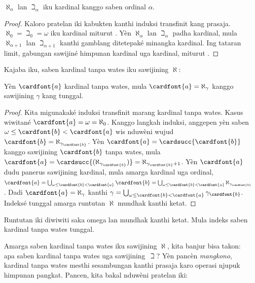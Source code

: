 \documentclass[../../../include/open-logic-section]{subfiles}
\begin{document}
\begin{prop}
$\aleph_\alpha$ lan $\beth_\alpha$ iku kardinal kanggo saben
ordinal $\alpha$.
\end{prop}

\begin{proof}
Kaloro pratelan iki kabukten kanthi induksi transfinit kang prasaja.
$\aleph_0 = \beth_0 = \omega$ iku kardinal miturut
. Yèn $\aleph_\alpha$ lan
$\beth_\alpha$ padha kardinal, mula $\aleph_{\alpha+1}$ lan
$\beth_{\alpha+1}$ kanthi gamblang ditetepaké minangka kardinal.
Ing tataran limit, gabungan sawijiné himpunan kardinal uga kardinal,
miturut .
\end{proof}
\noindent
Kajaba iku, saben kardinal tanpa wates iku sawijining $\aleph$:

\begin{prop}
Yèn $\cardfont{a}$ kardinal tanpa wates, mula $\cardfont{a} =
\aleph_\gamma$ kanggo sawijining $\gamma$ kang tunggal.
\end{prop}

\begin{proof}
Kita migunakaké induksi transfinit marang kardinal tanpa wates.
Kasus wiwitané $\cardfont{a}=\omega=\aleph_0$. Kanggo langkah
induksi, anggepen yèn saben $\omega \leq \cardfont{b} < \cardfont{a}$
wis nduwèni wujud $\cardfont{b} = \aleph_{\gamma_\cardfont{b}}$.
Yèn $\cardfont{a} = \cardsucc{\cardfont{b}}$ kanggo sawijining
$\cardfont{b}$ tanpa wates, mula $\cardfont{a} =
\cardsucc{(\aleph_{\gamma_\cardfont{b}})}=
\aleph_{\gamma_\cardfont{b}+1}$. Yèn $\cardfont{a}$ dudu panerus
sawijining kardinal, mula amarga kardinal uga ordinal,
$\cardfont{a} = \bigcup_{\omega \leq \cardfont{b} < \cardfont{a}}
\cardfont{b} =
\bigcup_{\omega \leq \cardfont{b} < \cardfont{a}}{\aleph_{\gamma_\cardfont{b}}}$.
Dadi $\cardfont{a} = \aleph_\gamma$ kanthi $\gamma =
\bigcup_{\omega \leq \cardfont{b} < \cardfont{a}}\gamma_\cardfont{b}$.
Indeksé tunggal amarga runtutan $\aleph$ mundhak kanthi ketat.
\end{proof}
Runtutan iki diwiwiti saka omega lan mundhak kanthi ketat. Mula indeks saben kardinal tanpa wates tunggal.

Amarga saben kardinal tanpa wates iku sawijining $\aleph$, kita banjur
bisa takon: apa saben kardinal tanpa wates uga sawijining~$\beth$?
Yèn pancèn \emph{mangkono}, kardinal tanpa wates mesthi sesambungan kanthi
prasaja karo operasi njupuk himpunan pangkat. Pancen, kita bakal
nduwèni pratelan iki:
\end{document}
